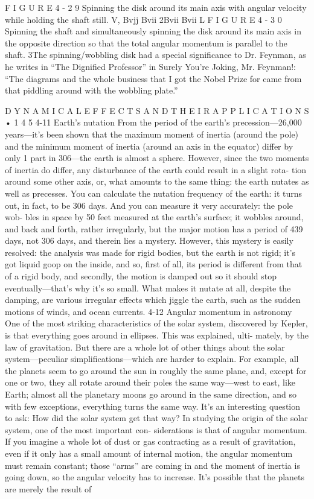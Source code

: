 \documentclass[10pt,oneside]{article}
\begin{document}
F I G U R E  4 - 2 9 Spinning the disk around its main axis with angular velocity while holding the shaft still. V, Bvjj Bvii 2Bvii Bvii L F I G U R E  4 - 3 0 Spinning the shaft and simultaneously spinning the disk around its main axis in the opposite direction so that the total angular momentum is parallel to the shaft. 3The spinning/wobbling disk had a special significance to Dr. Feynman, as he writes in “The Dignified Professor” in Surely You’re Joking, Mr. Feynman!: “The diagrams and the whole business that I got the Nobel Prize for came from that piddling around with the wobbling plate.”\par

D Y N A M I C A L  E F F E C T S  A N D  T H E I R  A P P L I C A T I O N S • 1 4 5 4-11 Earth’s nutation From the period of the earth’s precession---26,000 years---it’s been shown that the maximum moment of inertia (around the pole) and the minimum moment of inertia (around an axis in the equator) differ by only 1 part in 306---the earth is almost a sphere. However, since the two moments of inertia do differ, any disturbance of the earth could result in a slight rota- tion around some other axis, or, what amounts to the same thing: the earth nutates as well as precesses. You can calculate the nutation frequency of the earth: it turns out, in fact, to be 306 days. And you can measure it very accurately: the pole wob- bles in space by 50 feet measured at the earth’s surface; it wobbles around, and back and forth, rather irregularly, but the major motion has a period of 439 days, not 306 days, and therein lies a mystery. However, this mystery is easily resolved: the analysis was made for rigid bodies, but the earth is not rigid; it’s got liquid goop on the inside, and so, first of all, its period is different from that of a rigid body, and secondly, the motion is damped out so it should stop eventually---that’s why it’s so small. What makes it nutate at all, despite the damping, are various irregular effects which jiggle the earth, such as the sudden motions of winds, and ocean currents. 4-12 Angular momentum in astronomy One of the most striking characteristics of the solar system, discovered by Kepler, is that everything goes around in ellipses. This was explained, ulti- mately, by the law of gravitation. But there are a whole lot of other things about the solar system---peculiar simplifications---which are harder to explain. For example, all the planets seem to go around the sun in roughly the same plane, and, except for one or two, they all rotate around their poles the same way---west to east, like Earth; almost all the planetary moons go around in the same direction, and so with few exceptions, everything turns the same way. It’s an interesting question to ask: How did the solar system get that way? In studying the origin of the solar system, one of the most important con- siderations is that of angular momentum. If you imagine a whole lot of dust or gas contracting as a result of gravitation, even if it only has a small amount of internal motion, the angular momentum must remain constant; those “arms” are coming in and the moment of inertia is going down, so the angular velocity has to increase. It’s possible that the planets are merely the result of 
\end{document}
